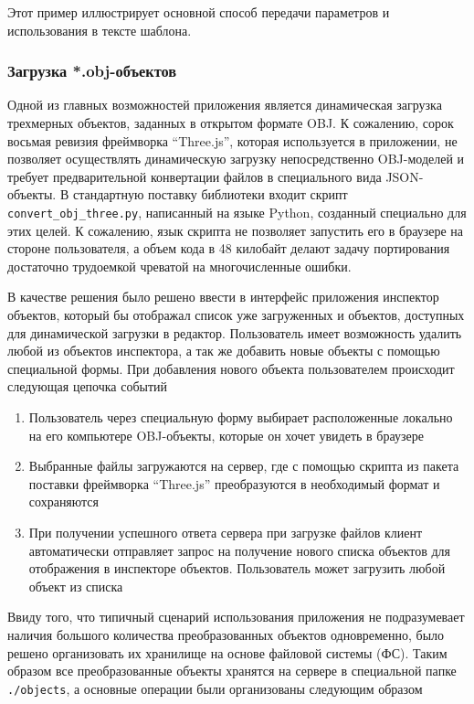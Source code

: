 \documentclass[14pt, a4paper]{extarticle}
\begin{document}
Этот пример иллюстрирует основной способ передачи параметров и использования в
тексте шаблона.

\subsubsection{Загрузка *.obj-объектов}

Одной из главных возможностей приложения является динамическая загрузка
трехмерных объектов, заданных в открытом формате OBJ. К сожалению, сорок восьмая
ревизия фреймворка ``Three.js'', которая используется в приложении, не позволяет
осуществлять динамическую загрузку непосредственно OBJ-моделей и требует
предварительной
конвертации файлов в специального вида JSON-объекты. В стандартную поставку
библиотеки входит скрипт \texttt{convert\_obj\_three.py}, написанный на языке
Python, созданный специально для этих целей. К сожалению, язык
скрипта не позволяет запустить его в браузере на стороне пользователя, а объем
кода в 48 килобайт делают задачу портирования достаточно трудоемкой чреватой на
многочисленные ошибки.

В качестве решения было решено ввести в интерфейс приложения инспектор объектов,
который бы отображал список уже загруженных и объектов,
доступных для динамической загрузки в редактор. Пользователь имеет возможность
удалить любой из объектов инспектора, а так же добавить новые объекты с помощью
специальной формы. При добавления нового объекта пользователем происходит
следующая цепочка событий

\begin{enumerate}
    \item Пользователь через специальную форму выбирает расположенные локально
    на его компьютере OBJ-объекты, которые он хочет увидеть в браузере
    \item Выбранные файлы загружаются на сервер, где с помощью скрипта из
    пакета поставки фреймворка ``Three.js'' преобразуются в необходимый формат и
    сохраняются
    \item При получении успешного ответа сервера при загрузке файлов клиент
    автоматически отправляет запрос на получение нового списка объектов для
    отображения в инспекторе объектов. Пользователь может загрузить любой
    объект из списка
\end{enumerate}

Ввиду того, что типичный сценарий использования приложения не подразумевает
наличия большого количества преобразованных объектов одновременно, было решено
организовать их хранилище на основе файловой системы (ФС). Таким образом все
преобразованные объекты хранятся на сервере в специальной папке
\texttt{./objects}, а основные операции были организованы следующим
образом
\end{document}
